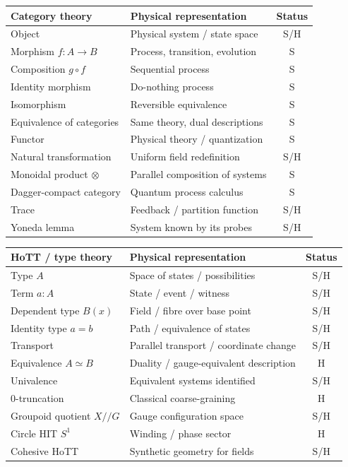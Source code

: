 \documentclass[12pt]{article}
\theoremstyle{definition}
\theoremstyle{remark}
\begin{document}
\begin{center}
\renewcommand{\arraystretch}{1.2}
\begin{tabular}{@{}L{4.4cm}L{4.6cm}c@{}}
\toprule
\textbf{Category theory} & \textbf{Physical representation} & \textbf{Status}\\
\midrule
Object & Physical system / state space & S/H\\
Morphism $f:A\to B$ & Process, transition, evolution & S\\
Composition $g\circ f$ & Sequential process & S\\
Identity morphism & Do-nothing process & S\\
Isomorphism & Reversible equivalence & S\\
Equivalence of categories & Same theory, dual descriptions & S\\
Functor & Physical theory / quantization & S\\
Natural transformation & Uniform field redefinition & S/H\\
Monoidal product $\otimes$ & Parallel composition of systems & S\\
Dagger-compact category & Quantum process calculus & S\\
Trace & Feedback / partition function & S/H\\
Yoneda lemma & System known by its probes & S/H\\
\bottomrule
\end{tabular}
\end{center}

\begin{center}
\renewcommand{\arraystretch}{1.2}
\begin{tabular}{@{}L{4.4cm}L{4.6cm}c@{}}
\toprule
\textbf{HoTT / type theory} & \textbf{Physical representation} & \textbf{Status}\\
\midrule
Type $A$ & Space of states / possibilities & S/H\\
Term $a:A$ & State / event / witness & S/H\\
Dependent type $B(x)$ & Field / fibre over base point & S/H\\
Identity type $a=b$ & Path / equivalence of states & S/H\\
Transport & Parallel transport / coordinate change & S/H\\
Equivalence $A\simeq B$ & Duality / gauge-equivalent description & H\\
Univalence & Equivalent systems identified & S/H\\
$0$-truncation & Classical coarse-graining & H\\
Groupoid quotient $X/\!/G$ & Gauge configuration space & S/H\\
Circle HIT $S^1$ & Winding / phase sector & H\\
Cohesive HoTT & Synthetic geometry for fields & S/H\\
\bottomrule
\end{tabular}
\end{center}
\end{document}
